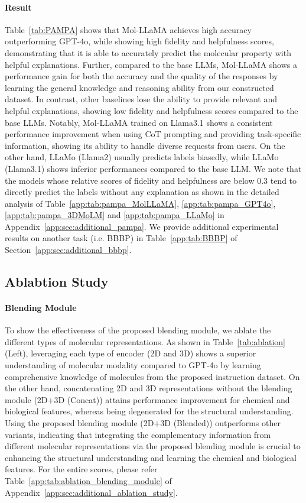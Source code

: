 \vspace{-0.05in}
\paragraph{Result} Table~\ref{tab:PAMPA} shows that Mol-LLaMA achieves high accuracy outperforming GPT-4o, while showing high fidelity and helpfulness scores, demonstrating that it is able to accurately predict the molecular property with helpful explanations. Further, compared to the base LLMs, Mol-LLaMA shows a performance gain for both the accuracy and the quality of the responses by learning the general knowledge and reasoning ability from our constructed dataset. In contrast, other baselines lose the ability to provide relevant and helpful explanations, showing low fidelity and helpfulness scores compared to the base LLMs. Notably, Mol-LLaMA trained on Llama3.1 shows a consistent performance improvement when using CoT prompting and providing task-specific information, showing its ability to handle diverse requests from users. On the other hand, LLaMo (Llama2) usually predicts labels biasedly, while LLaMo (Llama3.1) shows inferior performances compared to the base LLM. We note that the models whose relative scores of fidelity and helpfulness are below 0.3 tend to directly predict the labels without any explanation as shown in the detailed analysis of Table~\ref{app:tab:pampa_MolLLaMA}, \ref{app:tab:pampa_GPT4o}, \ref{app:tab:pampa_3DMoLM} and \ref{app:tab:pampa_LLaMo} in Appendix~\ref{app:sec:additional_pampa}. We provide additional experimental results on another task (i.e. BBBP) in Table~\ref{app:tab:BBBP} of Section~\ref{app:sec:additional_bbbp}.

\vspace{-0.05in}
\subsection{Ablabtion Study}
\vspace{-0.05in}
\paragraph{Blending Module} To show the effectiveness of the proposed blending module, we ablate the different types of molecular representations. As shown in Table~\ref{tab:ablation} (Left), leveraging each type of encoder (2D and 3D) shows a superior understanding of molecular modality compared to GPT-4o by learning comprehensive knowledge of molecules from the proposed instruction dataset. On the other hand, concatenating 2D and 3D representations without the blending module (2D+3D (Concat)) attains performance improvement for chemical and biological features, whereas being degenerated for the structural understanding. Using the proposed blending module (2D+3D (Blended)) outperforms other variants, indicating that integrating the complementary information from different molecular representations via the proposed blending module is crucial to enhancing the structural understanding and learning the chemical and biological features. For the entire scores, please refer Table~\ref{app:tab:ablation_blending_module} of Appendix~\ref{app:sec:additional_ablation_study}.

